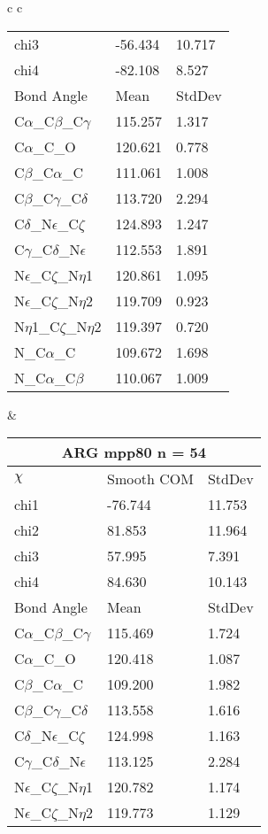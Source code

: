 \begin{longtable}{ c c }
\begin{tabular}{ l l l }
  chi3 & -56.434 & 10.717 \\ 
  chi4 & -82.108 & 8.527 \\ \midrule
  Bond Angle   & Mean     & StdDev \\ \midrule
  C$\alpha$\_C$\beta$\_C$\gamma$ & 115.257 & 1.317\\
  C$\alpha$\_C\_O & 120.621 & 0.778\\
  C$\beta$\_C$\alpha$\_C & 111.061 & 1.008\\
  C$\beta$\_C$\gamma$\_C$\delta$ & 113.720 & 2.294\\
  C$\delta$\_N$\epsilon$\_C$\zeta$ & 124.893 & 1.247\\
  C$\gamma$\_C$\delta$\_N$\epsilon$ & 112.553 & 1.891\\
  N$\epsilon$\_C$\zeta$\_N$\eta$1 & 120.861 & 1.095\\
  N$\epsilon$\_C$\zeta$\_N$\eta$2 & 119.709 & 0.923\\
  N$\eta$1\_C$\zeta$\_N$\eta$2 & 119.397 & 0.720\\
  N\_C$\alpha$\_C & 109.672 & 1.698\\
  N\_C$\alpha$\_C$\beta$ & 110.067 & 1.009\\
  \bottomrule
  \end{tabular}
  &
  \begin{tabular}{ l l l }
  \toprule
  \multicolumn{3}{c}{ARG \textbf{mpp80} n = 54} \\ \toprule
  $\chi$       & Smooth COM & StdDev \\ \midrule
  chi1 & -76.744 & 11.753 \\ 
  chi2 & 81.853 & 11.964 \\ 
  chi3 & 57.995 & 7.391 \\ 
  chi4 & 84.630 & 10.143 \\ \midrule
  Bond Angle   & Mean     & StdDev \\ \midrule
  C$\alpha$\_C$\beta$\_C$\gamma$ & 115.469 & 1.724\\
  C$\alpha$\_C\_O & 120.418 & 1.087\\
  C$\beta$\_C$\alpha$\_C & 109.200 & 1.982\\
  C$\beta$\_C$\gamma$\_C$\delta$ & 113.558 & 1.616\\
  C$\delta$\_N$\epsilon$\_C$\zeta$ & 124.998 & 1.163\\
  C$\gamma$\_C$\delta$\_N$\epsilon$ & 113.125 & 2.284\\
  N$\epsilon$\_C$\zeta$\_N$\eta$1 & 120.782 & 1.174\\
  N$\epsilon$\_C$\zeta$\_N$\eta$2 & 119.773 & 1.129\\

\end{tabular}
\end{longtable}
